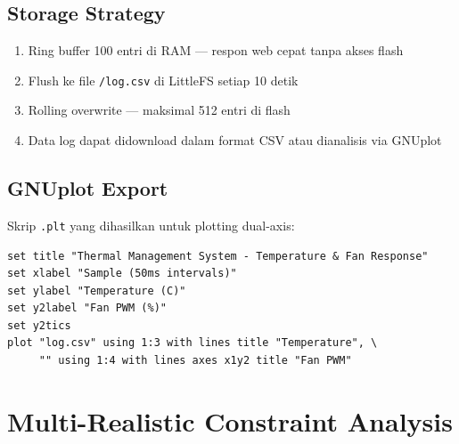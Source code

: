 \documentclass[11pt,a4paper]{article}
\begin{document}
\subsection{Storage Strategy}

\begin{enumerate}
    \item Ring buffer 100 entri di RAM --- respon web cepat tanpa akses flash
    \item Flush ke file \texttt{/log.csv} di LittleFS setiap 10 detik
    \item Rolling overwrite --- maksimal 512 entri di flash
    \item Data log dapat didownload dalam format CSV atau dianalisis via GNUplot
\end{enumerate}

\subsection{GNUplot Export}

Skrip \texttt{.plt} yang dihasilkan untuk plotting dual-axis:
\begin{verbatim}
set title "Thermal Management System - Temperature & Fan Response"
set xlabel "Sample (50ms intervals)"
set ylabel "Temperature (C)"
set y2label "Fan PWM (%)"
set y2tics
plot "log.csv" using 1:3 with lines title "Temperature", \
     "" using 1:4 with lines axes x1y2 title "Fan PWM"
\end{verbatim}

\section{Multi-Realistic Constraint Analysis}
\end{document}

